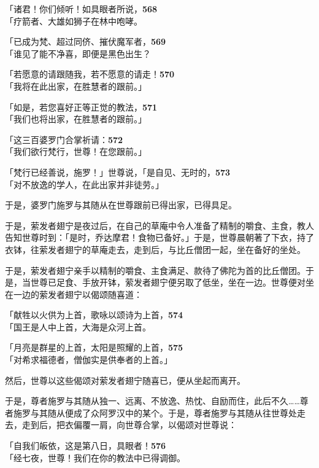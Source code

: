 「诸君！你们倾听！如具眼者所说，\hfill{\grayfootnotesize \textbf{568}} \\
「疗箭者、大雄如狮子在林中咆哮。


「已成为梵、超过同侪、摧伏魔军者，\hfill{\grayfootnotesize \textbf{569}} \\
「谁见了能不净喜，即便是黑色出生？


「若愿意的请跟随我，若不愿意的请走！\hfill{\grayfootnotesize \textbf{570}} \\
「我将在此出家，在胜慧者的跟前。」

「如是，若您喜好正等正觉的教法，\hfill{\grayfootnotesize \textbf{571}} \\
「我们也将出家，在胜慧者的跟前。」


「这三百婆罗门合掌祈请：\hfill{\grayfootnotesize \textbf{572}} \\
「我们欲行梵行，世尊！在您跟前。」


「梵行已经善说，施罗！」世尊说，「是自见、无时的，\hfill{\grayfootnotesize \textbf{573}} \\
「对不放逸的学人，在此出家并非徒劳。」


于是，婆罗门施罗与其随从在世尊跟前已得出家，已得具足。


于是，萦发者翅宁是夜过后，在自己的草庵中令人准备了精制的嚼食、主食，教人告知世尊时到：「是时，乔达摩君！食物已备好。」于是，世尊晨朝著了下衣，持了衣钵，往萦发者翅宁的草庵走去，走到后，与比丘僧团一起，坐在备好的坐处。

于是，萦发者翅宁亲手以精制的嚼食、主食满足、款待了佛陀为首的比丘僧团。于是，当世尊已足食、手放开钵，萦发者翅宁便另取了低坐，坐在一边。世尊便对坐在一边的萦发者翅宁以偈颂随喜道：


「献牲以火供为上首，歌咏以颂诗为上首，\hfill{\grayfootnotesize \textbf{574}} \\
「国王是人中上首，大海是众河上首。


「月亮是群星的上首，太阳是照耀的上首，\hfill{\grayfootnotesize \textbf{575}} \\
「对希求福德者，僧伽实是供奉者的上首。」


然后，世尊以这些偈颂对萦发者翅宁随喜已，便从坐起而离开。

于是，尊者施罗与其随从独一、远离、不放逸、热忱、自励而住，此后不久……尊者施罗与其随从便成了众阿罗汉中的某个。于是，尊者施罗与其随从往世尊处走去，走到后，把衣偏覆一肩，向世尊合掌，以偈颂对世尊说：

「自我们皈依，这是第八日，具眼者！\hfill{\grayfootnotesize \textbf{576}} \\
「经七夜，世尊！我们在你的教法中已得调御。


